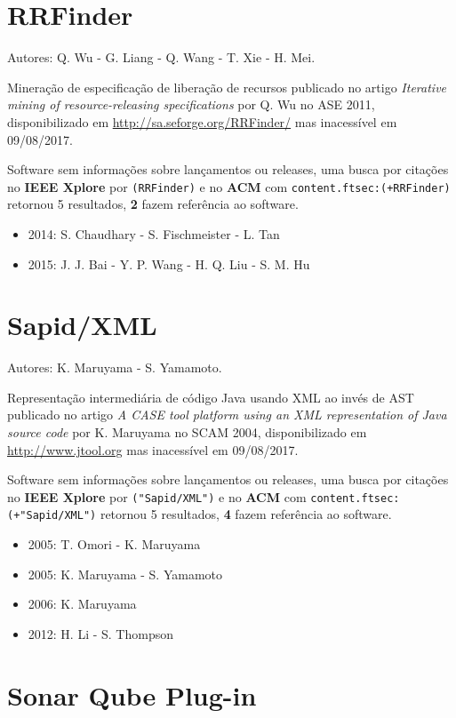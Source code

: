 \section{RRFinder}

Autores:
Q. Wu - G. Liang - Q. Wang - T. Xie - H. Mei.

Mineração de especificação de liberação de recursos
publicado no artigo {\it Iterative mining of resource-releasing specifications}
por Q. Wu
no ASE 2011,
disponibilizado em \url{http://sa.seforge.org/RRFinder/}
mas inacessível em 09/08/2017.

Software sem informações sobre lançamentos ou releases,
uma busca por citações no {\bf IEEE Xplore} por
\texttt{(RRFinder)}
e no {\bf ACM} com
\texttt{content.ftsec:(+RRFinder)}
retornou
5 resultados,
{\bf 2} fazem referência ao software.

\begin{itemize}
\item 2014: S. Chaudhary - S. Fischmeister - L. Tan
\item 2015: J. J. Bai - Y. P. Wang - H. Q. Liu - S. M. Hu
\end{itemize}

\section{Sapid/XML}

Autores:
K. Maruyama - S. Yamamoto.

Representação intermediária de código Java usando XML ao invés de AST
publicado no artigo {\it A CASE tool platform using an XML representation of Java source code}
por K. Maruyama
no SCAM 2004,
disponibilizado em \url{http://www.jtool.org}
mas inacessível em 09/08/2017.

Software sem informações sobre lançamentos ou releases,
uma busca por citações no {\bf IEEE Xplore} por
\texttt{("Sapid/XML")}
e no {\bf ACM} com
\texttt{content.ftsec:(+"Sapid/XML")}
retornou
5 resultados,
{\bf 4} fazem referência ao software.

\begin{itemize}
\item 2005: T. Omori - K. Maruyama
\item 2005: K. Maruyama - S. Yamamoto
\item 2006: K. Maruyama
\item 2012: H. Li - S. Thompson
\end{itemize}

\section{Sonar Qube Plug-in}

